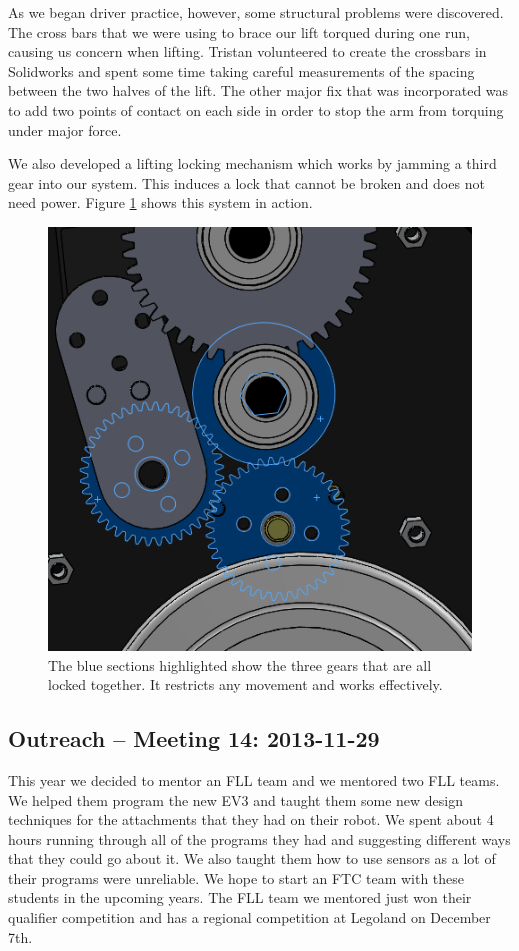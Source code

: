 As we began driver practice, however, some structural problems were discovered. The cross bars that we were using to brace our lift torqued during one run, causing us concern when lifting. Tristan volunteered to create the crossbars in Solidworks and spent some time taking careful measurements of the spacing between the two halves of the lift. The other major fix that was incorporated was to add two points of contact on each side in order to stop the arm from torquing under major force.

We also developed a lifting locking mechanism which works by jamming a third gear into our system. This induces a lock that cannot be broken and does not need power. Figure \ref{locking} shows this system in action.

\begin{figure}[H]
\begin{center}
\includegraphics[scale=0.75]{images/Gearlock.png}
\end{center}
\caption{The blue sections highlighted show the three gears that are all locked together. It restricts any movement and works effectively.}
\label{locking}
\end{figure}

\newpage \subsection{Outreach -- Meeting 14: 2013-11-29}
This year we decided to mentor an FLL team and we mentored two FLL teams. We helped them program the new EV3 and taught them some new design techniques for the attachments that they had on their robot. We spent about 4 hours running through all of the programs they had and suggesting different ways that they could go about it. We also taught them how to use sensors as a lot of their programs were unreliable. We hope to start an FTC team with these students in the upcoming years. The FLL team we mentored just won their qualifier competition and has a regional competition at Legoland on December 7th. 

